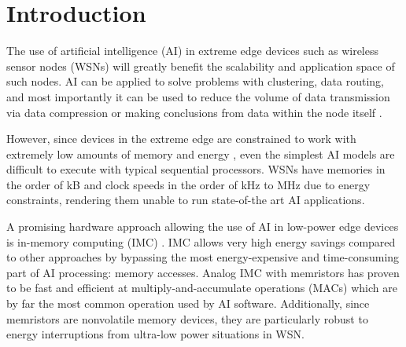 \chapter{Introduction}

The use of artificial intelligence (AI) in extreme edge devices such as wireless sensor nodes (WSNs) will greatly benefit the scalability and application space of such nodes. AI can be applied to solve problems with clustering, data routing, and most importantly it can be used to reduce the volume of data transmission via data compression or making conclusions from data within the node itself \cite{alsheikh2014machine}.

However, since devices in the extreme edge are constrained to work with extremely low amounts of memory and energy \cite{Ma_2019}, even the simplest AI models are difficult to execute with typical sequential processors. WSNs have memories in the order of kB and clock speeds in the order of kHz to MHz due to energy constraints, rendering them unable to run state-of-the art AI applications.

A promising hardware approach allowing the use of AI in low-power edge devices is in-memory computing (IMC) \cite{Patterson_1997}. IMC allows very high energy savings compared to other approaches by bypassing the most energy-expensive and time-consuming part of AI processing: memory accesses. Analog IMC with memristors has proven to be fast and efficient at multiply-and-accumulate operations (MACs) which are by far the most common operation used by AI software. Additionally, since memristors are nonvolatile memory devices, they are particularly robust to energy interruptions from ultra-low power situations in WSN. 



